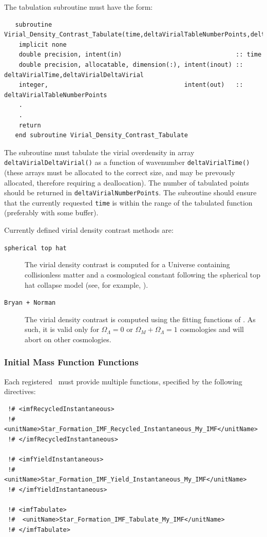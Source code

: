 The tabulation subroutine must have the form:
\begin{verbatim}
   subroutine Virial_Density_Contrast_Tabulate(time,deltaVirialTableNumberPoints,deltaVirialTime,deltaVirialDeltaVirial)
    implicit none
    double precision, intent(in)                               :: time
    double precision, allocatable, dimension(:), intent(inout) :: deltaVirialTime,deltaVirialDeltaVirial
    integer,                                     intent(out)   :: deltaVirialTableNumberPoints
    .
    .
    return
   end subroutine Virial_Density_Contrast_Tabulate
\end{verbatim}
The subroutine must tabulate the virial overdensity in array {\tt deltaVirialDeltaVirial()} as a function of wavenumber {\tt deltaVirialTime()} (these arrays must be allocated to the correct size, and may be prevously allocated, therefore requiring a deallocation). The number of tabulated points should be returned in {\tt deltaVirialNumberPoints}. The subroutine should ensure that the currently requested {\tt time} is within the range of the tabulated function (preferably with some buffer).

Currently defined virial density contrast methods are:
\begin{description}
 \item [{\tt spherical top hat}] The virial density contrast is computed for a Universe containing collisionless matter and a cosmological constant following the spherical top hat collapse model (see, for example, \citealt{percival_cosmological_2005}).
 \item [{\tt Bryan + Norman}] The virial density contrast is computed using the fitting functions of \cite{bryan_statistical_1998}. As such, it is valid only for $\Omega_\Lambda=0$ or $\Omega_M+\Omega_\Lambda=1$ cosmologies and will abort on other cosmologies.
\end{description}

\subsubsection{Initial Mass Function Functions}\label{sec:IMF_functions}

Each registered \IMF\ must provide multiple functions, specified by the following directives:
\begin{verbatim}
 !# <imfRecycledInstantaneous>
 !#  <unitName>Star_Formation_IMF_Recycled_Instantaneous_My_IMF</unitName>
 !# </imfRecycledInstantaneous>

 !# <imfYieldInstantaneous>
 !#  <unitName>Star_Formation_IMF_Yield_Instantaneous_My_IMF</unitName>
 !# </imfYieldInstantaneous>

 !# <imfTabulate>
 !#  <unitName>Star_Formation_IMF_Tabulate_My_IMF</unitName>
 !# </imfTabulate>
\end{verbatim}

